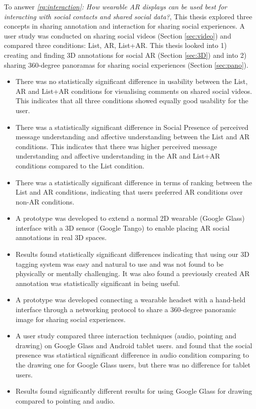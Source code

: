 \noindent
To answer \textit{\ref{rq:interaction}: How wearable AR displays can be used best for interacting with social contacts and shared social data?}, This thesis explored three concepts in sharing annotation and interaction for sharing social experiences. A user study was conducted on sharing social videos (Section \ref{sec:video}) and compared three conditions: List, AR, List+AR. This thesis looked into 1) creating and finding 3D annotations for social AR (Section \ref{sec:3D}) and into 2) sharing 360-degree panoramas for sharing social experiences (Section \ref{sec:pano}). 

\begin{itemize}
    \item{There was no statistically significant difference in usability between the List, AR and List+AR conditions for visualising comments on shared social videos. This indicates that all three conditions showed equally good usability for the user.}
    \item{There was a statistically significant difference in Social Presence of perceived message understanding and affective understanding between the List and AR conditions. This indicates that there was higher perceived message understanding and affective understanding in the AR and List+AR conditions compared to the List condition.}
    \item{There was a statistically significant difference in terms of ranking between the List and AR conditions, indicating that users preferred AR conditions over non-AR conditions.}
    \item{A prototype was developed to extend a normal 2D wearable (Google Glass) interface with a 3D sensor (Google Tango) to enable placing AR social annotations in real 3D spaces.}
    \item{Results found statistically significant differences indicating that using our 3D tagging system was easy and natural to use and was not found to be physically or mentally challenging. It was also found a previously created AR annotation was statistically significant in being useful.}
    \item{A prototype was developed connecting a wearable headset with a hand-held interface through a networking protocol to share a 360-degree panoramic image for sharing social experiences.}
    \item{A user study compared three interaction techniques (audio, pointing and drawing) on Google Glass and Android tablet users. and found that the social presence was statistical significant difference in audio condition comparing to the drawing one for Google Glass users, but there was no difference for tablet users.}
    \item{Results found significantly different results for using Google Glass for drawing compared to pointing and audio.}
\end{itemize}

